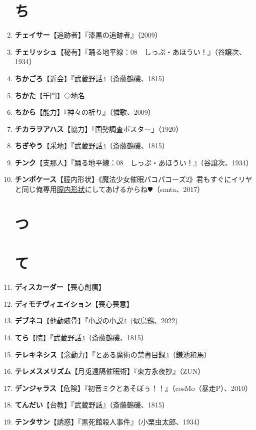 \documentclass[twocolumn]{jsbook}
\newcommand{\ccite}[1]{《#1》}
\begin{document}
\begin{enumerate}
\section*{ち}
    \item \textbf{チェイサー}【追跡者】『漆黒の追跡者』（2009）
    \item \textbf{チェリッシュ}【秘有】『踊る地平線：08　しっぷ・あほうい！』（谷譲次、1934）
    \item \textbf{ちかごろ}【近会】『武蔵野話』（斎藤鶴磯、1815）
    \item \textbf{ちかた}【千門】◇地名
    \item \textbf{ちから}【能力】『神々の祈り』（憐歌、2009）
    \item \textbf{チカラヲアハス}【協力】「国勢調査ポスター」（1920）
    \item \textbf{ちぎやう}【采地】『武蔵野話』（斎藤鶴磯、1815）
    \item \textbf{チンク}【支那人】『踊る地平線：08　しっぷ・あほうい！』（谷譲次、1934）
    \item \textbf{チンポケース}【膣内形状】\ccite{魔法少女催眠パコパコーズ2}{君もすぐにイリヤと同じ俺専用\uline{膣内形状}にしてあげるからね$\varheartsuit$}（santa、2017）
\section*{つ}
\section*{て}
    \item \textbf{ディスカーダー}【喪心創痍】
    \item \textbf{ディモチヴィエイション}【喪心喪意】
    \item \textbf{デブネコ}【他動骸骨】『小説の小説』(似鳥鶏、2022)
    \item \textbf{てら}【院】『武蔵野話』（斎藤鶴磯、1815）
    \item \textbf{テレキネシス}【念動力】『とある魔術の禁書目録』（鎌池和馬）
    \item \textbf{テレメスメリズム}【月兎遠隔催眠術】『東方永夜抄』（ZUN）
    \item \textbf{デンジャラス}【危険】『初音ミクとあそぼぅ！！』（cosMo（暴走P）、2010）
    \item \textbf{てんだい}【台教】『武蔵野話』（斎藤鶴磯、1815）
    \item \textbf{テンタサン}【誘惑】『黒死館殺人事件』（小栗虫太郎、1934）

\end{enumerate}
\end{document}
